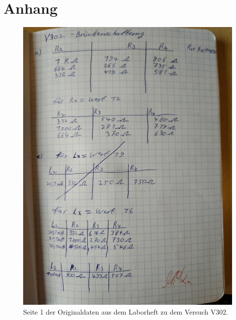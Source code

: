 \newpage
\section{Anhang}
\begin{figure}
    \centering
    \includegraphics[width=\textwidth, angle=270]{content/daten1.jpg}
    \caption{Seite 1 der Originaldaten aus dem Laborheft zu dem Versuch V302.}
\end{figure}
